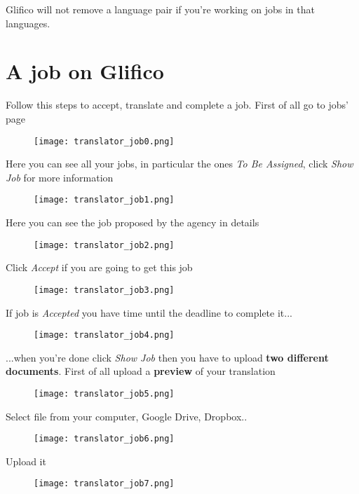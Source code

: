 \documentclass[11 pt, a4paper]{article}
\begin{document}
Glifico will not remove a language pair if you're working on jobs in that languages.

\clearpage
\section{A job on Glifico}
Follow this steps to accept, translate and complete a job.
First of all go to jobs' page
\begin{figure}[H]
\centering
\texttt{[image: translator\_job0.png]}
\end{figure}

Here you can see all your jobs, in particular the ones \textit{To Be Assigned}, click \textit{Show Job} for more information
\begin{figure}[H]
\centering
\texttt{[image: translator\_job1.png]}
\end{figure}


\clearpage
Here you can see the job proposed by the agency in details
\begin{figure}[H]
\centering
\texttt{[image: translator\_job2.png]}
\end{figure}

Click \textit{Accept} if you are going to get this job
\begin{figure}[H]
\centering
\texttt{[image: translator\_job3.png]}
\end{figure}


\clearpage
If job is \textit{Accepted} you have time until the deadline to complete it...
\begin{figure}[H]
\centering
\texttt{[image: translator\_job4.png]}
\end{figure}

...when you're done click \textit{Show Job} then you have to upload \textbf{two different documents}.
First of all upload a \textbf{preview} of your translation
\begin{figure}[H]
\centering
\texttt{[image: translator\_job5.png]}
\end{figure}


\clearpage
Select file from your computer, Google Drive, Dropbox..
\begin{figure}[H]
\centering
\texttt{[image: translator\_job6.png]}
\end{figure}

Upload it
\begin{figure}[H]
\centering
\texttt{[image: translator\_job7.png]}
\end{figure}
\end{document}
